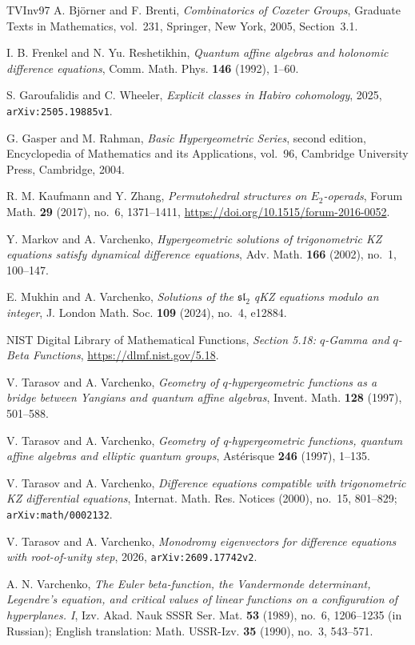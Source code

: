 \documentclass[12pt]{amsart}
\theoremstyle{definition}
\numberwithin{equation}{section}
\theoremstyle{definition}
\begin{document}
\begin{thebibliography}{TVInv97}
A. Bj\"orner and F. Brenti,
\textit{Combinatorics of Coxeter Groups},
Graduate Texts in Mathematics, vol.~231,
Springer, New York, 2005, Section~3.1.

I. B. Frenkel and N. Yu. Reshetikhin,
\textit{Quantum affine algebras and holonomic difference equations},
Comm. Math. Phys. \textbf{146} (1992), 1--60.

S. Garoufalidis and C. Wheeler,
\textit{Explicit classes in Habiro cohomology},
2025, \texttt{arXiv:2505.19885v1}.

G. Gasper and M. Rahman,
\textit{Basic Hypergeometric Series}, second edition,
Encyclopedia of Mathematics and its Applications, vol.~96,
Cambridge University Press, Cambridge, 2004.

R. M. Kaufmann and Y. Zhang,
\textit{Permutohedral structures on $E_2$-operads},
Forum Math. \textbf{29} (2017), no.~6, 1371--1411,
\url{https://doi.org/10.1515/forum-2016-0052}.

Y. Markov and A. Varchenko,
\textit{Hypergeometric solutions of trigonometric KZ equations satisfy
dynamical difference equations}, Adv. Math. \textbf{166} (2002), no.~1,
100--147.

E. Mukhin and A. Varchenko,
\textit{Solutions of the $\mathfrak{sl}_2$ qKZ
equations modulo an integer},
J. London Math. Soc. \textbf{109} (2024),
no.~4, e12884.

NIST Digital Library of Mathematical Functions,
\textit{Section 5.18: $q$-Gamma and $q$-Beta Functions},
\url{https://dlmf.nist.gov/5.18}.

V. Tarasov and A. Varchenko,
\textit{Geometry of $q$-hypergeometric functions
as a bridge between Yangians and quantum
affine algebras},
Invent. Math. \textbf{128} (1997), 501--588.

V. Tarasov and A. Varchenko,
\textit{Geometry of q-hypergeometric functions, quantum affine algebras and
elliptic quantum groups}, Ast\'erisque \textbf{246} (1997), 1--135.

V. Tarasov and A. Varchenko,
\textit{Difference equations compatible with trigonometric KZ differential
equations}, Internat. Math. Res. Notices (2000), no.~15,
801--829; \texttt{arXiv:math/0002132}.

V. Tarasov and A. Varchenko,
\textit{Monodromy eigenvectors for difference equations with
root-of-unity step},
2026, \texttt{arXiv:2609.17742v2}.

A. N. Varchenko,
\textit{The Euler beta-function, the Vandermonde determinant,
Legendre's equation, and critical values of linear functions on a
configuration of hyperplanes. I},
Izv. Akad. Nauk SSSR Ser. Mat. \textbf{53} (1989), no.~6,
1206--1235 (in Russian); English translation:
Math. USSR-Izv. \textbf{35} (1990), no.~3, 543--571.
\end{thebibliography}
\end{document}
